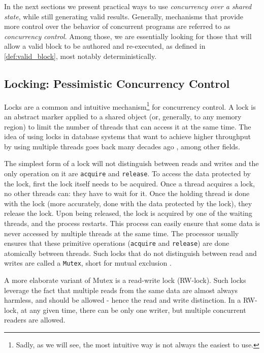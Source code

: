 In the next sections we present practical ways to use \textit{concurrency over a shared state},
while still generating valid results. Generally, mechanisms that provide
more control over the behavior of concurrent programs are referred to as  \textit{concurrency
control}. Among those, we are essentially looking for those that will allow a valid block to be
authored and re-executed, as defined in \ref{def:valid_block}, most notably deterministically.

\subsection{Locking: Pessimistic Concurrency Control} \label{chap_bg:subsec:lock}

Locks are a common and intuitive mechanism\footnote{Sadly, as we will see, the most intuitive way is
not always the easiest to use.} for concurrency control. A lock is an abstract marker applied to a
shared object (or, generally, to any memory region) to limit the number of threads that can access
it at the same time. The idea of using locks in database systems that want to achieve higher
throughput by using multiple threads goes back many decades ago
\cite{kedemControllingConcurrencyUsing1979, morrisPerformanceAnalysisLocking1985}, among other
fields.

The simplest form of a lock will not distinguish between reads and writes and the only operation on
it are \texttt{acquire} and \texttt{release}. To access the data protected by the lock, first the
lock itself needs to be acquired. Once a thread acquires a lock, no other threads can: they have to
wait for it. Once the holding thread is done with the lock (more accurately, done with the data
protected by the lock), they release the lock. Upon being released, the lock is acquired by one of
the waiting threads, and the process restarts. This process can easily ensure that some data is
never accessed by multiple threads at the same time. The processor usually ensures that these
primitive operations (\texttt{acquire} and \texttt{release}) are done atomically between threads.
Such locks that do not distinguish between read and writes are called a \texttt{Mutex}, short for
mutual exclusion \cite{guerraouiLockUnlockThat2019}.

A more elaborate variant of Mutex is a read-write lock (RW-lock). Such locks leverage the fact that
multiple reads from the same data are almost always harmless, and should be allowed - hence the read
and write distinction. In a RW-lock, at any given time, there can be only one writer, but multiple
concurrent readers are allowed.

